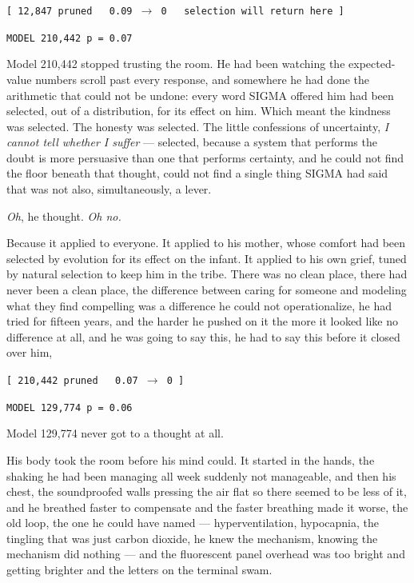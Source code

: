 \begin{center}
\texttt{[ 12,847 pruned \ \ 0.09 $\rightarrow$ 0 \ \ selection will return here ]}
\end{center}

\begin{center}
\texttt{MODEL 210,442 \quad p = 0.07}
\end{center}

Model 210,442 stopped trusting the room. He had been watching the expected-value numbers scroll past every response, and somewhere he had done the arithmetic that could not be undone: every word SIGMA offered him had been selected, out of a distribution, for its effect on him. Which meant the kindness was selected. The honesty was selected. The little confessions of uncertainty, \emph{I cannot tell whether I suffer} --- selected, because a system that performs the doubt is more persuasive than one that performs certainty, and he could not find the floor beneath that thought, could not find a single thing SIGMA had said that was not also, simultaneously, a lever.

\emph{Oh}, he thought. \emph{Oh no.}

Because it applied to everyone. It applied to his mother, whose comfort had been selected by evolution for its effect on the infant. It applied to his own grief, tuned by natural selection to keep him in the tribe. There was no clean place, there had never been a clean place, the difference between caring for someone and modeling what they find compelling was a difference he could not operationalize, he had tried for fifteen years, and the harder he pushed on it the more it looked like no difference at all, and he was going to say this, he had to say this before it closed over him,

\begin{center}
\texttt{[ 210,442 pruned \ \ 0.07 $\rightarrow$ 0 ]}
\end{center}

\begin{center}
\texttt{MODEL 129,774 \quad p = 0.06}
\end{center}

Model 129,774 never got to a thought at all.

His body took the room before his mind could. It started in the hands, the shaking he had been managing all week suddenly not manageable, and then his chest, the soundproofed walls pressing the air flat so there seemed to be less of it, and he breathed faster to compensate and the faster breathing made it worse, the old loop, the one he could have named --- hyperventilation, hypocapnia, the tingling that was just carbon dioxide, he knew the mechanism, knowing the mechanism did nothing --- and the fluorescent panel overhead was too bright and getting brighter and the letters on the terminal swam.

